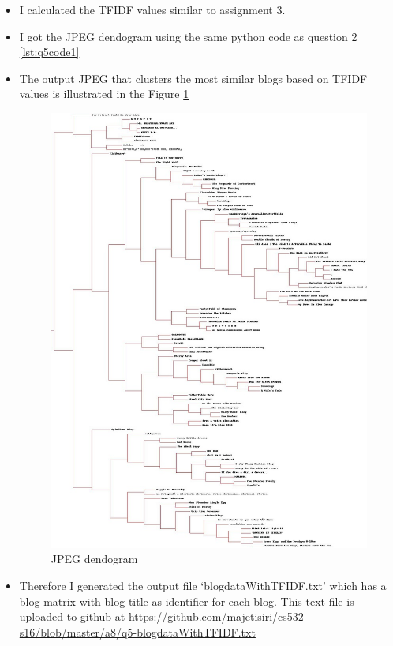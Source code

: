 \begin{itemize}
\item I calculated the TFIDF values similar to assignment 3.
\item I got the JPEG dendogram using the same python code as question 2 \ref{lst:q5code1} 
\newpage
\item The output JPEG that clusters the most similar blogs based on TFIDF values is illustrated in the Figure \ref{fig:q5fig1}
\begin{figure}[h!]
\begin{center}
\includegraphics[scale=0.55, keepaspectratio=true]{figures/blogclust1.jpg}
\caption{JPEG dendogram}
\label{fig:q5fig1}
\end{center}
\end{figure}
\item Therefore I generated the output file `blogdataWithTFIDF.txt' which has a blog matrix with blog title as identifier for each blog. This text file is uploaded to github at \url{https://github.com/majetisiri/cs532-s16/blob/master/a8/q5-blogdataWithTFIDF.txt}

\end{itemize}
